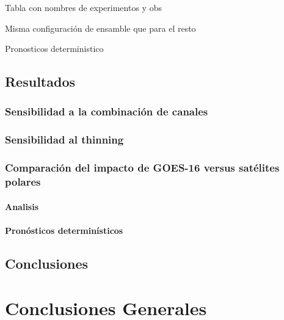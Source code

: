 \documentclass[12pt,oneside]{reedthesis}
\begin{document}
Tabla con nombres de experimentos y obs

Misma configuración de ensamble que para el resto

Pronosticos deterministico

\hypertarget{resultados-2}{%
\section{Resultados}\label{resultados-2}}

\hypertarget{sensibilidad-a-la-combinaciuxf3n-de-canales}{%
\subsection{Sensibilidad a la combinación de canales}\label{sensibilidad-a-la-combinaciuxf3n-de-canales}}

\hypertarget{thinning}{%
\subsection{Sensibilidad al thinning}\label{thinning}}

\hypertarget{comparaciuxf3n-del-impacto-de-goes-16-versus-satuxe9lites-polares}{%
\subsection{Comparación del impacto de GOES-16 versus satélites polares}\label{comparaciuxf3n-del-impacto-de-goes-16-versus-satuxe9lites-polares}}

\hypertarget{analisis}{%
\subsubsection{Analisis}\label{analisis}}

\hypertarget{pronuxf3sticos-determinuxedsticos}{%
\subsubsection{Pronósticos determinísticos}\label{pronuxf3sticos-determinuxedsticos}}

\hypertarget{conclusiones-2}{%
\section{Conclusiones}\label{conclusiones-2}}

\hypertarget{conclusiones-generales}{%
\chapter*{Conclusiones Generales}\label{conclusiones-generales}}
\end{document}

